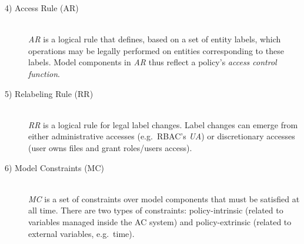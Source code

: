\documentclass[twoside, openright, 12pt]{book}
\begin{document}
\begin{description}
\item[4) Access Rule (AR)]\hfill \\
\textit{AR} is a logical rule that defines, based on a set of entity labels, which operations may be legally performed on entities corresponding to these labels. Model components in \textit{AR} thus reflect a policy’s \textit{access control function}.


\item[5) Relabeling Rule (RR)]\hfill \\
\textit{RR} is a logical rule for legal label changes.
Label changes can emerge from either administrative accesses (e.g.~RBAC's \textit{UA}) or discretionary accesses (user owns files and grant roles/users access).


\item[6) Model Constraints (MC)]\hfill \\
\textit{MC} is a set of constraints over model components that must be satisfied at all time.
There are two types of constraints: policy-intrinsic (related to variables managed inside the AC system) and policy-extrinsic (related to external variables, e.g.~time).

\end{description}
\end{document}
